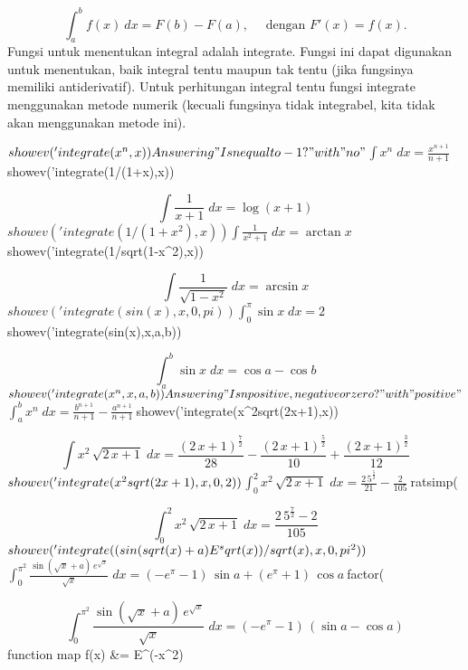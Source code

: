 \documentclass{article}
\begin{document}
$$\int_a^b f(x)\ dx = F(b)-F(a), \quad \text{ dengan  } F'(x) = f(x).$$Fungsi untuk menentukan integral adalah integrate. Fungsi ini dapat
digunakan untuk menentukan, baik integral tentu maupun tak tentu (jika
fungsinya memiliki antiderivatif). Untuk perhitungan integral tentu
fungsi integrate menggunakan metode numerik (kecuali fungsinya tidak
integrabel, kita tidak akan menggunakan metode ini).


\>$showev('integrate(x^n,x))


    Answering "Is n equal to -1?" with "no"

$$\int {x^{n}}{\;dx}=\frac{x^{n+1}}{n+1}$$\>$showev('integrate(1/(1+x),x))


$$\int {\frac{1}{x+1}}{\;dx}=\log \left(x+1\right)$$\>$showev('integrate(1/(1+x^2),x))


$$\int {\frac{1}{x^2+1}}{\;dx}=\arctan x$$\>$showev('integrate(1/sqrt(1-x^2),x))


$$\int {\frac{1}{\sqrt{1-x^2}}}{\;dx}=\arcsin x$$\>$showev('integrate(sin(x),x,0,pi))


$$\int_{0}^{\pi}{\sin x\;dx}=2$$\>$showev('integrate(sin(x),x,a,b))


$$\int_{a}^{b}{\sin x\;dx}=\cos a-\cos b$$\>$showev('integrate(x^n,x,a,b))


    Answering "Is n positive, negative or zero?" with "positive"

$$\int_{a}^{b}{x^{n}\;dx}=\frac{b^{n+1}}{n+1}-\frac{a^{n+1}}{n+1}$$\>$showev('integrate(x^2\*sqrt(2\*x+1),x))


$$\int {x^2\,\sqrt{2\,x+1}}{\;dx}=\frac{\left(2\,x+1\right)^{\frac{7
 }{2}}}{28}-\frac{\left(2\,x+1\right)^{\frac{5}{2}}}{10}+\frac{\left(
 2\,x+1\right)^{\frac{3}{2}}}{12}$$\>$showev('integrate(x^2\*sqrt(2\*x+1),x,0,2))


$$\int_{0}^{2}{x^2\,\sqrt{2\,x+1}\;dx}=\frac{2\,5^{\frac{5}{2}}}{21}-
 \frac{2}{105}$$\>$ratsimp(%


$$\int_{0}^{2}{x^2\,\sqrt{2\,x+1}\;dx}=\frac{2\,5^{\frac{7}{2}}-2}{
 105}$$\>$showev('integrate((sin(sqrt(x)+a)\*E^sqrt(x))/sqrt(x),x,0,pi^2))


$$\int_{0}^{\pi^2}{\frac{\sin \left(\sqrt{x}+a\right)\,e^{\sqrt{x}}}{
 \sqrt{x}}\;dx}=\left(-e^{\pi}-1\right)\,\sin a+\left(e^{\pi}+1
 \right)\,\cos a$$\>$factor(%


$$\int_{0}^{\pi^2}{\frac{\sin \left(\sqrt{x}+a\right)\,e^{\sqrt{x}}}{
 \sqrt{x}}\;dx}=\left(-e^{\pi}-1\right)\,\left(\sin a-\cos a\right)$$\>function map f(x) &= E^(-x^2)
\end{document}

